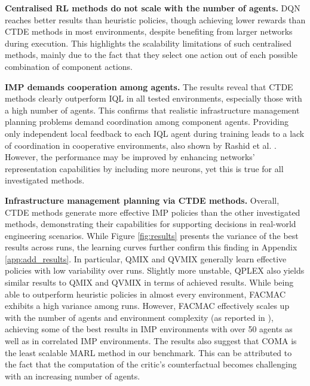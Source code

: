 \textbf{Centralised RL methods do not scale with the number of agents.}
DQN reaches better results than heuristic policies, though achieving lower rewards than CTDE methods in most environments, despite benefiting from larger networks during execution.
This highlights the scalability limitations of such centralised methods, mainly due to the fact that they select one action out of each possible combination of component actions.

\textbf{IMP demands cooperation among agents.}
The results reveal that CTDE methods clearly outperform IQL in all tested environments, especially those with a high number of agents.
This confirms that realistic infrastructure management planning problems demand coordination among component agents.
Providing only independent local feedback to each IQL agent during training leads to a lack of coordination in cooperative environments, also shown by Rashid et al. \cite{Rashid2018}. 
However, the performance may be improved by enhancing networks' representation capabilities by including more neurons, yet this is true for all investigated methods.

\textbf{Infrastructure management planning via CTDE methods.}
Overall, CTDE methods generate more effective IMP policies than the other investigated methods, demonstrating their capabilities for supporting decisions in real-world engineering scenarios.
While Figure \ref{fig:results} presents the variance of the best results across runs, the learning curves further confirm this finding in Appendix \ref{app:add_results}.
In particular, QMIX and QVMIX generally learn effective policies with low variability over runs. 
Slightly more unstable, QPLEX also yields similar results to QMIX and QVMIX in terms of achieved results.
While being able to outperform heuristic policies in almost every environment, FACMAC exhibits a high variance among runs.
However, FACMAC effectively scales up with the number of agents and environment complexity (as reported in \citep{peng2021facmac}), achieving some of the best results in IMP environments with over 50 agents as well as in correlated IMP environments.
The results also suggest that COMA is the least scalable MARL method in our benchmark.
This can be attributed to the fact that the computation of the critic's counterfactual becomes challenging with an increasing number of agents.

